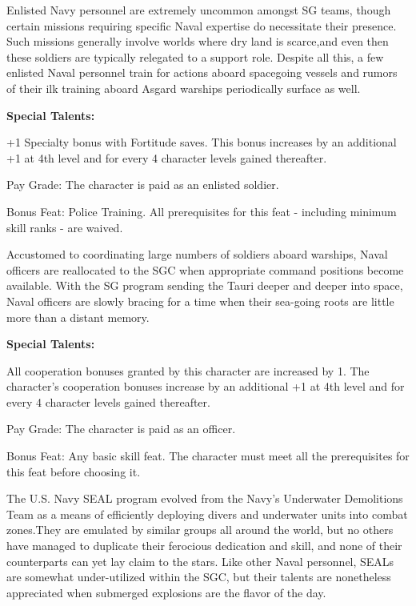 Enlisted Navy personnel are extremely uncommon amongst SG teams, though certain missions requiring specific Naval expertise do necessitate their presence. Such missions generally involve worlds where dry land is scarce,and even then these soldiers are typically relegated to a support role. Despite all this, a few enlisted Naval personnel train for actions aboard spacegoing vessels and rumors of their ilk training aboard Asgard warships periodically surface as well.

\textbf{Special Talents:}
\begin{itemize*}
\item +1 Specialty bonus with Fortitude saves. This bonus increases by an additional +1 at 4th level and for every 4 character levels gained thereafter.
\item Pay Grade: The character is paid as an enlisted soldier.
\item Bonus Feat: Police Training. All prerequisites for this feat - including minimum skill ranks - are waived.
\end{itemize*}

Accustomed to coordinating large numbers of soldiers aboard warships, Naval officers are reallocated to the SGC when appropriate command positions become available. With the SG program sending the Tauri deeper and deeper into space, Naval officers are slowly bracing for a time when their sea-going roots are little more than a distant memory.

\textbf{Special Talents:}
\begin{itemize*}
\item All cooperation bonuses granted by this character are increased by 1. The character's cooperation bonuses increase by an additional +1 at 4th level and for every 4 character levels gained thereafter.
\item Pay Grade: The character is paid as an officer.
\item Bonus Feat: Any basic skill feat. The character must meet all the prerequisites for this feat before choosing it.
\end{itemize*}

The U.S. Navy SEAL program evolved from the Navy's Underwater Demolitions Team as a means of efficiently deploying divers and underwater units into combat zones.They are emulated by similar groups all around the world, but no others have managed to duplicate their ferocious dedication and skill, and none of their counterparts can yet lay claim to the stars. Like other Naval personnel, SEALs are somewhat under-utilized within the SGC, but their talents are nonetheless appreciated when submerged explosions are the flavor of the day.

